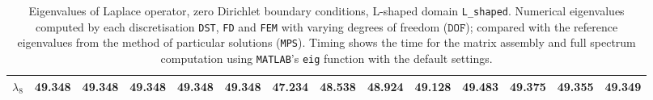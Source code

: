 \begin{table}[htbp]
{{\begin{tabular}{lrrrrrrrrrrrrr}
    $\lambda_{8}$ & \textbf{49.348} & 49.348 & 49.348 & 49.348 & 49.348 & 47.234 & 48.538 & 48.924 & 49.128 & 49.483 & 49.375 & 49.355 & 49.349 \\
    \bottomrule
  \end{tabular}}}
  \caption{Eigenvalues of Laplace operator, zero Dirichlet boundary conditions, L-shaped domain \texttt{L\_shaped}. Numerical eigenvalues computed by each discretisation \texttt{DST}, \texttt{FD} and \texttt{FEM} with varying degrees of freedom ($\mathtt{DOF}$); compared with the reference eigenvalues from the method of particular solutions (\texttt{MPS}). Timing shows the time for the matrix assembly and full spectrum computation using \texttt{MATLAB}'s \lstinline{eig} function with the default settings.}
  \label{tab:eigenvalues_head_L_shaped_transposed}
\end{table}
